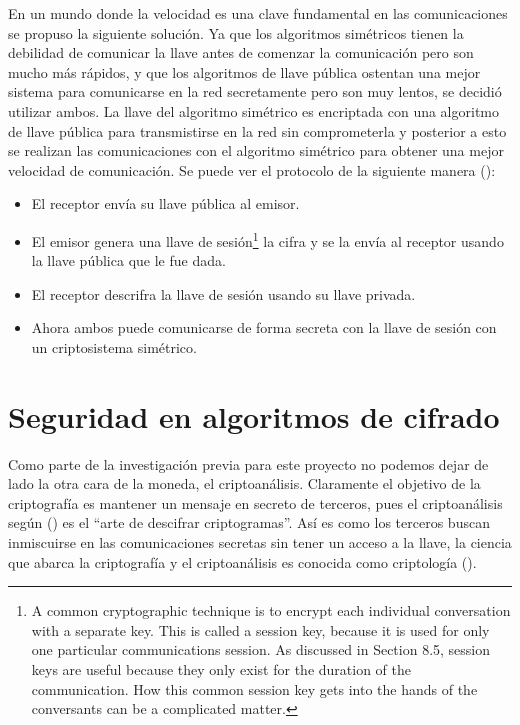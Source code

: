 En un mundo donde la velocidad es una clave fundamental en las comunicaciones se propuso la siguiente solución. Ya que los algoritmos simétricos tienen la debilidad de comunicar la llave antes de comenzar la comunicación pero son mucho más rápidos, y que los algoritmos de llave pública ostentan una mejor sistema para comunicarse en la red secretamente pero son muy lentos, se decidió utilizar ambos. La llave del algoritmo simétrico es encriptada con una algoritmo de llave pública para transmistirse en la red sin comprometerla y posterior a esto se realizan las comunicaciones con el algoritmo simétrico para obtener una mejor velocidad de comunicación. Se puede ver el protocolo de la siguiente manera (\cite{bruce}):
\begin{itemize}
\item El receptor envía su llave pública al emisor.
\item El emisor genera una llave de sesión\footnote{A common cryptographic technique is to encrypt each individual conversation with a separate key. This is called a session key, because it is used for only one
particular communications session. As discussed in Section 8.5, session keys
are useful because they only exist for the duration of the communication. How
this common session key gets into the hands of the conversants can be a
complicated matter.} la cifra y se la envía al receptor usando la llave pública que le fue dada.
\item El receptor descrifra la llave de sesión usando su llave privada.
\item Ahora ambos puede comunicarse de forma secreta con la llave de sesión con un criptosistema simétrico.
\end{itemize}





\section{Seguridad en algoritmos de cifrado}
Como parte de la investigación previa para este proyecto no podemos dejar de lado la otra cara de la moneda, el criptoanálisis. Claramente el objetivo de la criptografía es mantener un mensaje en secreto de terceros, pues el criptoanálisis según (\cite{raeAnalisis}) es el ``arte de descifrar criptogramas''. Así es como los terceros buscan inmiscuirse en las comunicaciones secretas sin tener un acceso a la llave, la ciencia que abarca la criptografía y el criptoanálisis es conocida como criptología (\cite{denning}). 

